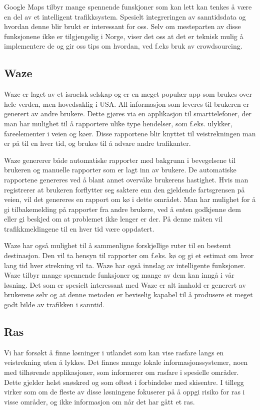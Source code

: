\documentclass[a4paper,norsk,oneside]{book}
\begin{document}
Google Maps tilbyr mange spennende funskjoner som kan lett kan tenkes å være en del av et intelligent trafikksystem. Spesielt integreringen av sanntidsdata og hvordan denne blir brukt er interessant for oss. Selv om mesteparten av disse funksjonene ikke er tilgjengelig i Norge, viser det oss at det er teknisk mulig å implementere de og gir oss tips om hvordan, ved f.eks bruk av crowdsourcing.

\subsection{Waze}
Waze er laget av et israelsk selskap og er en meget populær app som brukes over hele verden, men hovedsaklig i USA. All informasjon som leveres til brukeren er generert av andre brukere. Dette gjøres via en applikasjon til smarttelefoner, der man har mulighet til å rapportere ulike type hendelser, som f.eks. ulykker, fareelementer i veien og køer. Disse rapportene blir knyttet til veistrekningen man er på til en hver tid, og brukes til å advare andre trafikanter. 

Waze genererer både automatiske rapporter med bakgrunn i bevegelsene til brukeren og manuelle rapporter som er lagt inn av brukere. De automatiske rapportene genereres ved å blant annet overvåke brukerens hastighet. Hvis man registrerer at brukeren forflytter seg saktere enn den gjeldende fartsgrensen på veien, vil det genereres en rapport om kø i dette området. Man har mulighet for å gi tilbakemelding på rapporter fra andre brukere, ved å enten godkjenne dem eller gi beskjed om at problemet ikke lenger er der. På denne måten vil trafikkmeldingene til en hver tid være oppdatert.

Waze har også mulighet til å sammenligne forskjellige ruter til en bestemt destinasjon. Den vil ta hensyn til rapporter om f.eks. kø og gi et estimat om hvor lang tid hver strekning vil ta. Waze har også innslag av intelligente funksjoner. Waze tilbyr mange spennende funksjoner og mange av dem kan inngå i vår løsning. Det som er spesielt interessant med Waze er alt innhold er generert av brukerene selv og at denne metoden er beviselig kapabel til å produsere et meget godt bilde av trafikken i sanntid.

\subsection{Ras}
Vi har forsøkt å finne løsninger i utlandet som kan vise rasfare langs en veistrekning uten å lykkes. Det finnes mange lokale informasjonssystemer, noen med tilhørende applikasjoner, som informerer om rasfare i spesielle områder. Dette gjelder helst snøskred og som oftest i forbindelse med skisentre. I tillegg virker som om de fleste av disse løsningene fokuserer på å oppgi risiko for ras i visse områder, og ikke informasjon om når det har gått et ras.
\end{document}
